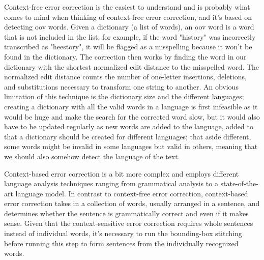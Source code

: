 Context-free error correction is the easiest to understand and is probably what comes to mind when thinking of context-free error correction, and it's based on detecting \gls{oov} words. Given a dictionary (a list of words), an \gls{oov} word is a word that is not included in the list; for example, if the word "history" was incorrectly transcribed as "heestory", it will be flagged as a misspelling because it won't be found in the dictionary. The correction then works by finding the word in our dictionary with the shortest normalized edit distance to the misspelled word. The normalized edit distance \cite{yujian_normalized_2007} counts the number of one-letter insertions, deletions, and substitutions necessary to transform one string to another. An obvious limitation of this technique is the dictionary size and the different languages; creating a dictionary with all the valid words in a language is first infeasible as it would be huge and make the search for the corrected word slow, but it would also have to be updated regularly as new words are added to the language, added to that a dictionary should be created for different languages; that aside different, some words might be invalid in some languages but valid in others, meaning that we should also somehow detect the language of the text.

Context-based error correction is a bit more complex and employs different language analysis techniques ranging from grammatical analysis to a state-of-the-art language model. In contrast to context-free error correction, context-based error correction takes in a collection of words, usually arranged in a sentence, and determines whether the sentence is grammatically correct and even if it makes sense. Given that the context-sensitive error correction requires whole sentences instead of individual words, it's necessary to run the bounding-box stitching before running this step to form sentences from the individually recognized words. 